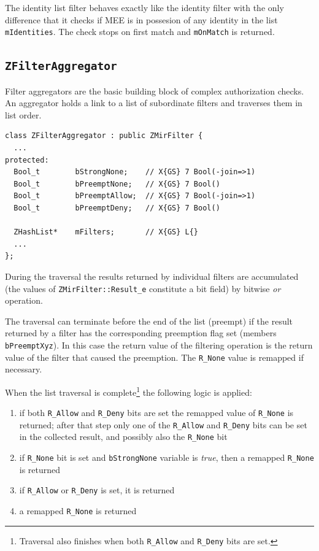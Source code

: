 \documentclass[a4paper,11pt]{article}
\def\smalltt#1{{\small\texttt{#1}}}
\def\foottt#1{{\footnotesize\texttt{#1}}}
\begin{document}
The identity list filter behaves exactly like the identity filter with
the only difference that it checks if MEE is in possesion of any identity in
the list \smalltt{mIdentities}. The check stops on first match and
\smalltt{mOnMatch} is returned.


\subsection{\texttt{ZFilterAggregator}}

Filter aggregators are the basic building block of complex
authorization checks. An aggregator holds a link to a list of
subordinate filters and traverses them in list order.

{\footnotesize\begin{verbatim}
class ZFilterAggregator : public ZMirFilter {
  ...
protected:
  Bool_t        bStrongNone;    // X{GS} 7 Bool(-join=>1)
  Bool_t        bPreemptNone;   // X{GS} 7 Bool()
  Bool_t        bPreemptAllow;  // X{GS} 7 Bool(-join=>1)
  Bool_t        bPreemptDeny;   // X{GS} 7 Bool()

  ZHashList*    mFilters;       // X{GS} L{}
  ...
};
\end{verbatim}
}

During the traversal the results returned by individual filters are
accumulated (the values of \smalltt{ZMirFilter::Result\_e} constitute
a bit field) by bitwise \emph{or} operation.

The traversal can terminate before the end of the list (preempt) if
the result returned by a filter has the corresponding preemption flag
set (members \smalltt{bPreemptXyz}). In this case the return value of
the filtering operation is the return value of the filter that caused
the preemption. The \smalltt{R\_None} value is remapped if necessary.

When the list traversal is complete\footnote{Traversal also finishes
  when both \foottt{R\_Allow} and \foottt{R\_Deny} bits are set.} %
the following logic is applied:
\begin{enumerate}\parsep=0pt\itemsep=0pt
\item if both \smalltt{R\_Allow} and \smalltt{R\_Deny} bits are set
  the remapped value of \smalltt{R\_None} is returned;
  after that step only one of the \smalltt{R\_Allow} and \smalltt{R\_Deny}
  bits can be set in the collected result, and possibly also the
  \smalltt{R\_None} bit
\item if \smalltt{R\_None} bit is set and \smalltt{bStrongNone}
  variable is \emph{true}, then a remapped \smalltt{R\_None} is returned
\item if \smalltt{R\_Allow} or \smalltt{R\_Deny} is set, it is
  returned
\item a remapped \smalltt{R\_None} is returned
\end{enumerate}
\end{document}
